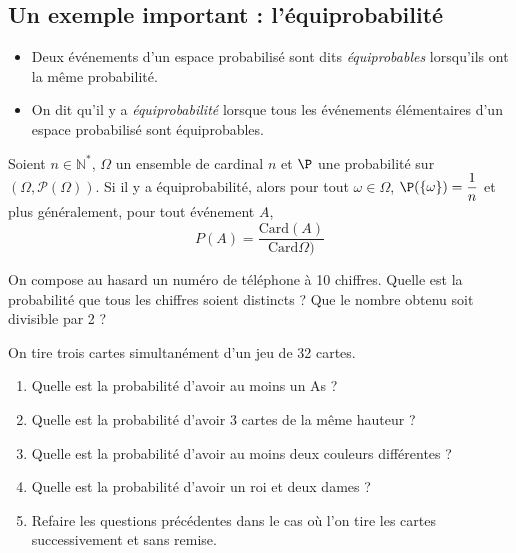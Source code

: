 \documentclass[a4paper,10pt]{report}
\begin{document}
\begin{enumerate}
\subsection{Un exemple important : l'équiprobabilité}

\begin{Definition}{}
 \begin{itemize}
 \item Deux événements d'un espace probabilisé sont dits \emph{équiprobables} lorsqu'ils ont la même probabilité.
\item On dit qu'il y a \emph{équiprobabilité} lorsque tous les événements élémentaires d'un espace probabilisé sont équiprobables.
 \end{itemize}
\end{Definition}
\begin{Theoreme}{}
 Soient $n \in \mathbb{N}^*$, $\Omega$ un ensemble de cardinal $n$ et $\P$ une probabilité sur $(\Omega,\mathcal{P}(\Omega))$. Si il y a équiprobabilité, alors pour tout $\omega \in \Omega$,
$ \P(\{\omega\}) = \dfrac 1n$ et plus généralement, pour tout événement $A$, 
$$P(A) = \frac{\textrm{Card}(A)}{\textrm{Card}\Omega)}$$
\end{Theoreme}

\begin{Exemple} On compose au hasard un numéro de téléphone à 10 chiffres. Quelle est la probabilité que tous les chiffres soient distincts ? Que le nombre obtenu soit divisible par 2 ?

\vspace{5cm}
\end{Exemple}

\begin{ApplicationDirecte}
On tire trois cartes simultanément d'un jeu de 32 cartes.
\begin{enumerate}
 \item Quelle est la probabilité d'avoir au moins un As ?
 \item Quelle est la probabilité d'avoir 3 cartes de la même hauteur ?
 \item Quelle est la probabilité d'avoir au moins deux couleurs différentes ?
 \item Quelle est la probabilité d'avoir un roi et deux dames ?
 \item Refaire les questions précédentes dans le cas où l'on tire les cartes successivement et sans remise.
\end{enumerate}
\end{ApplicationDirecte}


\end{enumerate}
\end{document}
